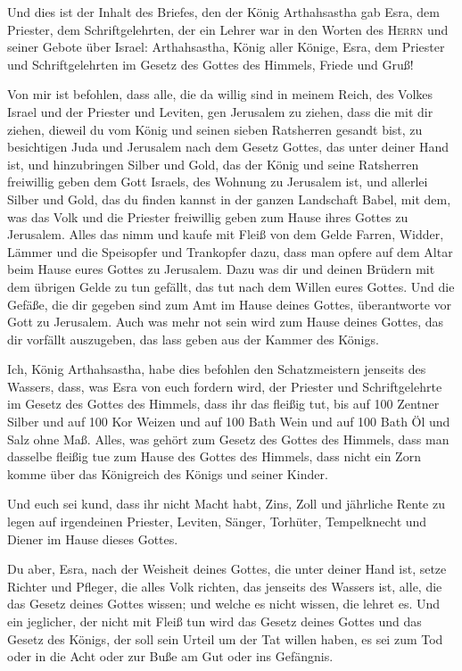  Und dies ist der Inhalt des Briefes, den der König
Arthahsastha gab Esra, dem Priester, dem Schriftgelehrten, der ein
Lehrer war in den Worten des \textsc{Herrn} und seiner Gebote über
Israel:  Arthahsastha, König aller Könige, Esra, dem
Priester und Schriftgelehrten im Gesetz des Gottes des Himmels, Friede
und Gruß!

 Von mir ist befohlen, dass alle, die da willig sind in
meinem Reich, des Volkes Israel und der Priester und Leviten, gen
Jerusalem zu ziehen, dass die mit dir ziehen,  dieweil du
vom König und seinen sieben Ratsherren gesandt bist, zu besichtigen Juda
und Jerusalem nach dem Gesetz Gottes, das unter deiner Hand ist,
 und hinzubringen Silber und Gold, das der König und
seine Ratsherren freiwillig geben dem Gott Israels, des Wohnung zu
Jerusalem ist,  und allerlei Silber und Gold, das du
finden kannst in der ganzen Landschaft Babel, mit dem, was das Volk und
die Priester freiwillig geben zum Hause ihres Gottes zu Jerusalem.
 Alles das nimm und kaufe mit Fleiß von dem Gelde Farren,
Widder, Lämmer und die Speisopfer und Trankopfer dazu, dass man opfere
auf dem Altar beim Hause eures Gottes zu Jerusalem.  Dazu
was dir und deinen Brüdern mit dem übrigen Gelde zu tun gefällt, das tut
nach dem Willen eures Gottes.  Und die Gefäße, die dir
gegeben sind zum Amt im Hause deines Gottes, überantworte vor Gott zu
Jerusalem.  Auch was mehr not sein wird zum Hause deines
Gottes, das dir vorfällt auszugeben, das lass geben aus der Kammer des
Königs.

 Ich, König Arthahsastha, habe dies befohlen den
Schatzmeistern jenseits des Wassers, dass, was Esra von euch fordern
wird, der Priester und Schriftgelehrte im Gesetz des Gottes des Himmels,
dass ihr das fleißig tut,  bis auf 100 Zentner Silber und
auf 100 Kor Weizen und auf 100 Bath Wein und auf 100 Bath Öl und Salz
ohne Maß.  Alles, was gehört zum Gesetz des Gottes des
Himmels, dass man dasselbe fleißig tue zum Hause des Gottes des Himmels,
dass nicht ein Zorn komme über das Königreich des Königs und seiner
Kinder.

 Und euch sei kund, dass ihr nicht Macht habt, Zins, Zoll
und jährliche Rente zu legen auf irgendeinen Priester, Leviten, Sänger,
Torhüter, Tempelknecht und Diener im Hause dieses Gottes.

 Du aber, Esra, nach der Weisheit deines Gottes, die
unter deiner Hand ist, setze Richter und Pfleger, die alles Volk
richten, das jenseits des Wassers ist, alle, die das Gesetz deines
Gottes wissen; und welche es nicht wissen, die lehret es.
 Und ein jeglicher, der nicht mit Fleiß tun wird das
Gesetz deines Gottes und das Gesetz des Königs, der soll sein Urteil um
der Tat willen haben, es sei zum Tod oder in die Acht oder zur Buße am
Gut oder ins Gefängnis.

